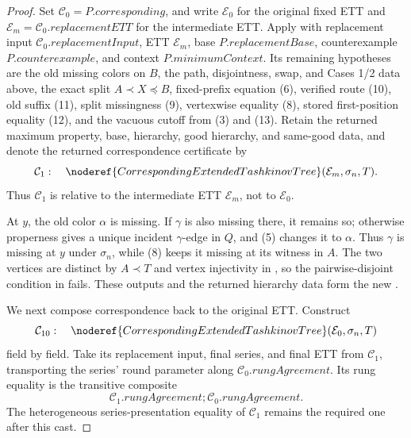 \begin{proof}
Set \(\mathcal C_0=P.\mathit{corresponding}\), and write
\(\mathcal E_0\) for the original fixed ETT and
\(\mathcal E_m=\mathcal C_0.\mathit{replacementETT}\) for the
intermediate ETT.  Apply
 with replacement input
\(\mathcal C_0.\mathit{replacementInput}\), ETT \(\mathcal E_m\), base
\(P.\mathit{replacementBase}\), counterexample
\(P.\mathit{counterexample}\), and context
\(P.\mathit{minimumContext}\).  Its remaining hypotheses are the old
missing colors on \(B\), the path, disjointness, swap, and Cases 1/2 data
above, the exact split \(A\prec X\preccurlyeq B\), fixed-prefix equation
(6), verified route (10), old suffix (11), split missingness (9),
vertexwise equality (8), stored first-position equality (12), and the
vacuous cutoff from (3) and (13).  Retain the returned maximum property,
base, hierarchy, good hierarchy, and same-good data, and denote the
returned correspondence certificate by
\[
 \mathcal C_1:\quad
 \noderef{CorrespondingExtendedTashkinovTree}
    (\mathcal E_m,\sigma_n,T).
\]
Thus \(\mathcal C_1\) is relative to the intermediate ETT
\(\mathcal E_m\), not to \(\mathcal E_0\).

At \(y\), the old color \(\alpha\) is missing.  If \(\gamma\) is also
missing there, it remains so; otherwise properness gives a unique
incident \(\gamma\)-edge in \(Q\), and (5) changes it to \(\alpha\).
Thus \(\gamma\) is missing at \(y\) under \(\sigma_n\), while (8) keeps
it missing at its witness in \(A\).  The two vertices are distinct by
\(A\prec T\) and vertex injectivity in , so the
pairwise-disjoint condition in
 fails.  These outputs and the
returned hierarchy data form the new .

We next compose correspondence back to the original ETT.  Construct
\[
 \mathcal C_{10}:\quad
 \noderef{CorrespondingExtendedTashkinovTree}
    (\mathcal E_0,\sigma_n,T)
\]
field by field.  Take its replacement input, final series, and final ETT
from \(\mathcal C_1\), transporting the series' round parameter along
\(\mathcal C_0.\mathit{rungAgreement}\).  Its rung equality is the
transitive composite
\[
 \mathcal C_1.\mathit{rungAgreement}\mathbin{;}
 \mathcal C_0.\mathit{rungAgreement}.
\]
The heterogeneous series-presentation equality of \(\mathcal C_1\)
remains the required one after this cast.


\end{proof}
